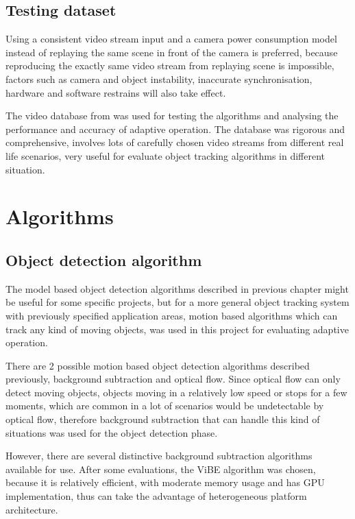 \subsection{Testing dataset}

Using a consistent video stream input and a camera power consumption model instead of replaying the same scene in front of the camera is preferred, because reproducing the exactly same video stream from replaying scene is impossible, factors such as camera and object instability, inaccurate synchronisation, hardware and software restrains will also take effect.

The video database from \cite{goyette2012changedetection} was used for testing the algorithms and analysing the performance and accuracy of adaptive operation. The database was rigorous and comprehensive, involves lots of carefully chosen video streams from different real life scenarios, very useful for evaluate object tracking algorithms in different situation.

\section{Algorithms}

\subsection{Object detection algorithm}

The model based object detection algorithms described in previous chapter might be useful for some specific projects, but for a more general object tracking system with previously specified application areas, motion based algorithms which can track any kind of moving objects, was used in this project for evaluating adaptive operation.

There are 2 possible motion based object detection algorithms described previously, background subtraction and optical flow. Since optical flow can only detect moving objects, objects moving in a relatively low speed or stops for a few moments, which are common in a lot of scenarios would be undetectable by optical flow, therefore background subtraction that can handle this kind of situations was used for the object detection phase.

However, there are several distinctive background subtraction algorithms available for use. After some evaluations, the ViBE algorithm was chosen, because it is relatively efficient, with moderate memory usage and has GPU implementation, thus can take the advantage of heterogeneous platform architecture.

